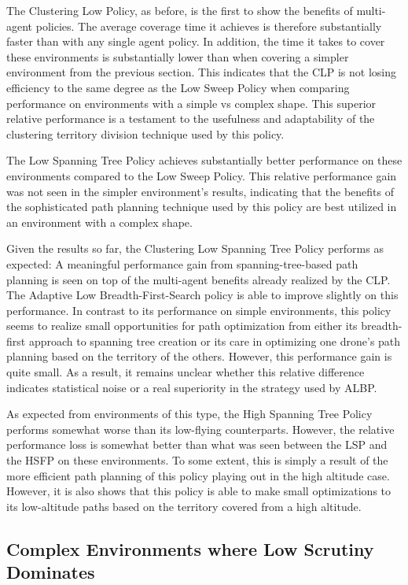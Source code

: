 The Clustering Low Policy, as before, is the first to show the benefits of multi-agent policies. The average coverage time it achieves is therefore substantially faster than with any single agent policy. In addition, the time it takes to cover these environments is substantially lower than when covering a simpler environment from the previous section. This indicates that the CLP is not losing efficiency to the same degree as the Low Sweep Policy when comparing performance on environments with a simple vs complex shape. This superior relative performance is a testament to the usefulness and adaptability of the clustering territory division technique used by this policy.

The Low Spanning Tree Policy achieves substantially better performance on these environments compared to the Low Sweep Policy. This relative performance gain was not seen in the simpler environment's results, indicating that the benefits of the sophisticated path planning technique used by this policy are best utilized in an environment with a complex shape.

Given the results so far, the Clustering Low Spanning Tree Policy performs as expected: A meaningful performance gain from spanning-tree-based path planning is seen on top of the multi-agent benefits already realized by the CLP. The Adaptive Low Breadth-First-Search policy is able to improve slightly on this performance. In contrast to its performance on simple environments, this policy seems to realize small opportunities for path optimization from either its breadth-first approach to spanning tree creation or its care in optimizing one drone's path planning based on the territory of the others. However, this performance gain is quite small. As a result, it remains unclear whether this relative difference indicates statistical noise or a real superiority in the strategy used by ALBP.

As expected from environments of this type, the High Spanning Tree Policy performs somewhat worse than its low-flying counterparts. However, the relative performance loss is somewhat better than what was seen between the LSP and the HSFP on these environments. To some extent, this is simply a result of the more efficient path planning of this policy playing out in the high altitude case. However, it is also shows that this policy is able to make small optimizations to its low-altitude paths based on the territory covered from a high altitude.

\subsection{Complex Environments where Low Scrutiny Dominates}

